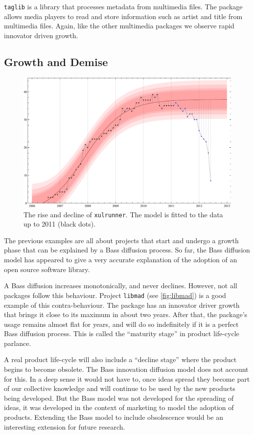 \documentclass[smallextended,final]{svjour3}
\begin{document}
\verb|taglib| is a library that processes metadata from multimedia files. The package allows media players to read and store information such as artist and title from multimedia files. Again, like the other multimedia packages we observe rapid innovator driven growth.

\subsection{Growth and Demise}

\begin{figure}
\small\centering
\includegraphics[width=0.6\linewidth]{BassFit-xulrunner-22.pdf}
\caption{The rise and decline of \texttt{xulrunner}. The model is fitted to the data up to 2011 (black dots).}\label{fig:xulrunner}
\end{figure}

The previous examples are all about projects that start and undergo a growth phase that can be explained by a Bass diffusion process. So far, the Bass diffusion model has appeared to give a very accurate explanation of the adoption of an open source software library.

A Bass diffusion increases monotonically, and never declines. However, not all packages follow this behaviour. Project \verb|libmad| (see \ref{fig:libmad}) is a good example of this contra-behaviour. The package has an innovator driver growth that brings it close to its maximum in about two years. After that, the package's usage remains almost flat for years, and will do so indefinitely if it is a perfect Bass diffusion process. This is called the ``maturity stage'' in product life-cycle parlance.

A real product life-cycle will also include a ``decline stage'' where the product begins to become obsolete. The Bass innovation diffusion model does not account for this. In a deep sense it would not have to, once ideas spread they become part of our collective knowledge and will continue to be used by the new products being developed. But the Bass model was not developed for the spreading of ideas, it was developed in the context of marketing to model the adoption of products. Extending the Bass model to include obsolescence would be an interesting extension for future research.
\end{document}
